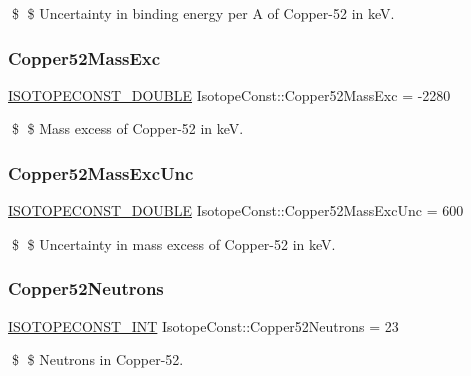 \$ \$ Uncertainty in binding energy per A of Copper-\/52 in keV. \mbox{\label{group___isotope_const-_copper-_cu52_ga8e5c53a272b41f6f65f92e433e7d2b89}} 
\subsubsection{\texorpdfstring{Copper52\+Mass\+Exc}{Copper52MassExc}}
{\footnotesize\ttfamily \mbox{\hyperlink{group___isotope_const-_macros_ga8f45a7272ce02c0b4c65c44636ed719a}{I\+S\+O\+T\+O\+P\+E\+C\+O\+N\+S\+T\+\_\+\+D\+O\+U\+B\+LE}} Isotope\+Const\+::\+Copper52\+Mass\+Exc = -\/2280}

\$ \$ Mass excess of Copper-\/52 in keV. \mbox{\label{group___isotope_const-_copper-_cu52_gaa5dd2276091c3253f75a558a18071b8a}} 
\subsubsection{\texorpdfstring{Copper52\+Mass\+Exc\+Unc}{Copper52MassExcUnc}}
{\footnotesize\ttfamily \mbox{\hyperlink{group___isotope_const-_macros_ga8f45a7272ce02c0b4c65c44636ed719a}{I\+S\+O\+T\+O\+P\+E\+C\+O\+N\+S\+T\+\_\+\+D\+O\+U\+B\+LE}} Isotope\+Const\+::\+Copper52\+Mass\+Exc\+Unc = 600}

\$ \$ Uncertainty in mass excess of Copper-\/52 in keV. \mbox{\label{group___isotope_const-_copper-_cu52_gab66a88d28aec2cf1990ffbb537509a23}} 
\subsubsection{\texorpdfstring{Copper52\+Neutrons}{Copper52Neutrons}}
{\footnotesize\ttfamily \mbox{\hyperlink{group___isotope_const-_macros_ga5f18360b3e99483a35c32d789e62621c}{I\+S\+O\+T\+O\+P\+E\+C\+O\+N\+S\+T\+\_\+\+I\+NT}} Isotope\+Const\+::\+Copper52\+Neutrons = 23}

\$ \$ Neutrons in Copper-\/52. \mbox{\label{group___isotope_const-_copper-_cu52_gad4eab8718ba09868007f9e3e7b7526c9}} 
